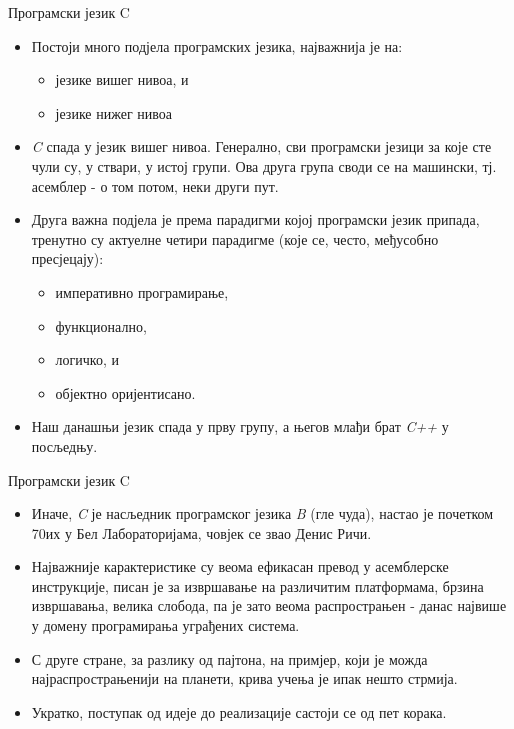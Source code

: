 \documentclass{beamer}
\begin{document}
\begin{frame}{Програмски језик C}
\begin{itemize}
    \item Постоји много подјела програмских језика, најважнија је на:
    \begin{itemize}
        \item језике вишег нивоа, и
        \item језике нижег нивоа
    \end{itemize}
    \item \textit{C} спада у језик вишег нивоа. Генерално, сви програмски језици за које сте чули су, у ствари, у истој групи. Ова друга група своди се на машински, тј. асемблер - о том потом, неки други пут.
    \item Друга важна подјела је према парадигми којој програмски језик припада, тренутно су актуелне четири парадигме (које се, често, међусобно пресјецају):
    \begin{itemize}
        \item императивно програмирање,
        \item функционално,
        \item логичко, и
        \item објектно оријентисано.
    \end{itemize}
    \item Наш данашњи језик спада у прву групу, а његов млађи брат \textit{C++} у посљедњу.
\end{itemize}
\end{frame}

\begin{frame}{Програмски језик C}
\begin{itemize}
    \item Иначе, \textit{C} је насљедник програмског језика \textit{B} (гле чуда), настао је почетком 70их у Бел Лабораторијама, човјек се звао Денис Ричи.
    \item Најважније карактеристике су веома ефикасан превод у асемблерске инструкције, писан је за извршавање на различитим платформама, брзина извршавања, велика слобода, па је зато веома распрострањен - данас највише у домену програмирања уграђених система.
    \item С друге стране, за разлику од пајтона, на примјер, који је можда најраспрострањенији на планети, крива учења је ипак нешто стрмија.
    \item Укратко, поступак од идеје до реализације састоји се од пет корака.
\end{itemize}
\end{frame}
\end{document}

